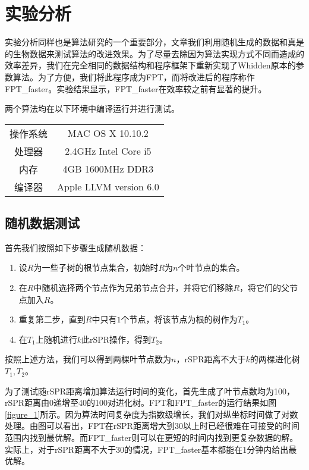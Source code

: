 
\chapter{实验分析}

实验分析同样也是算法研究的一个重要部分，文章我们利用随机生成的数据和真是的生物数据来测试算法的改进效果。为了尽量去除因为算法实现方式不同而造成的效率差异，我们在完全相同的数据结构和程序框架下重新实现了Whidden原本的参数算法。为了方便，我们将此程序成为FPT，而将改进后的程序称作FPT\_faster。实验结果显示，FPT\_faster在效率较之前有显著的提升。

两个算法均在以下环境中编译运行并进行测试。
\begin{center}
\begin{tabular}{ c c }
	\hline
  操作系统 & MAC OS X 10.10.2  \\
  处理器 & 2.4GHz Intel Core i5  \\
  内存 & 4GB 1600MHz DDR3  \\
  编译器 & Apple LLVM version 6.0 \\
	\hline
\end{tabular}
\end{center}

\section{随机数据测试}

首先我们按照如下步骤生成随机数据：
\begin{enumerate}
	\item 设$R$为一些子树的根节点集合，初始时$R$为$n$个叶节点的集合。
	\item 在$R$中随机选择两个节点作为兄弟节点合并，并将它们移除$R$，将它们的父节点加入$R$。
	\item 重复第二步，直到$R$中只有$1$个节点，将该节点为根的树作为$T_1$。
	\item 在$T_1$上随机进行$k$此rSPR操作，得到$T_2$。
\end{enumerate}

按照上述方法，我们可以得到两棵叶节点数为$n$，rSPR距离不大于$k$的两棵进化树$T_1,T_2$。

为了测试随rSPR距离增加算法运行时间的变化，首先生成了叶节点数均为100，rSPR距离由0递增至40的100对进化树。FPT和FPT\_faster的运行结果如图\ref{figure_1}所示。因为算法时间复杂度为指数级增长，我们对纵坐标时间做了对数处理。由图可以看出，FPT在rSPR距离增大到30以上时已经很难在可接受的时间范围内找到最优解。而FPT\_faster则可以在更短的时间内找到更复杂数据的解。实际上，对于rSPR距离不大于30的情况，FPT\_faster基本都能在1分钟内给出最优解。

